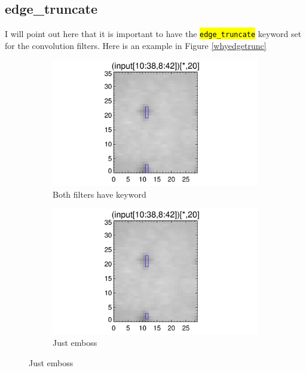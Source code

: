 \documentclass[10pt]{article}
\begin{document}
\subsection{edge\_truncate} %
\label{sub:edge_truncate}
I will point out here that it is important to have the \hl{\texttt{edge\_truncate}} keyword set for the convolution filters. Here is an example in Figure \ref{whyedgetrunc}

\begin{figure}[!h]
    \centering 
    \begin{subfigure}[b]{.45\linewidth}
        \centering
        \includegraphics[width=1.3\textwidth]{../plots_tables_images/fidcheck_withbothtruncate0.png}
        \caption{Both filters have keyword}
    \end{subfigure}
    \begin{subfigure}[b]{.45\linewidth}
        \centering
        \includegraphics[width=1.3\textwidth]{../plots_tables_images/fidcheck_withembosstruncate0.png}
        \caption{Just emboss}
    \end{subfigure}
   

\end{figure}
\end{document}
